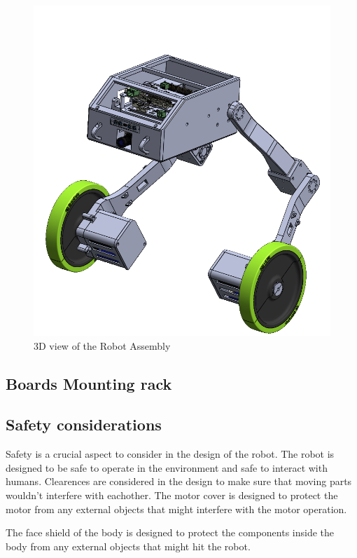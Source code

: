 \begin{figure}[h]
	\centering
	\includegraphics[width=1\linewidth]{Robot_Assembly_3}
	\caption[3D view of the Robot Assembly]{3D view of the Robot Assembly}
	\label{fig:robotassembly3}
\end{figure}
\subsection{Boards Mounting rack}
\subsection{Safety considerations}
Safety is a crucial aspect to consider in the design of the robot. The robot is designed to be safe to operate in the environment and safe to interact with humans. Clearences are considered in the design to make sure that moving parts wouldn't interfere with eachother.
The motor cover is designed to protect the motor from any external objects that might interfere with the motor operation.

The face shield of the body is designed to protect the components inside the body from any external objects that might hit the robot.



